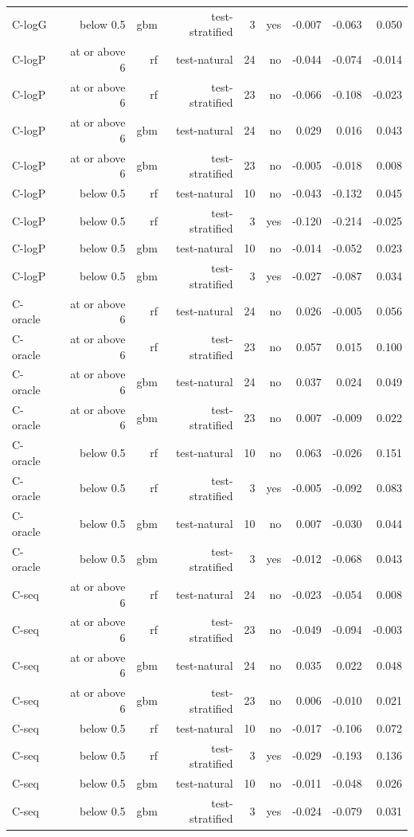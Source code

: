 \begin{table}[htbp]
\begin{tabular}{lrrrrrrrr}
C-logG & below 0.5 & gbm & test-stratified & 3 & yes & -0.007 & -0.063 & 0.050 \\
C-logP & at or above 6 & rf & test-natural & 24 & no & -0.044 & -0.074 & -0.014 \\
C-logP & at or above 6 & rf & test-stratified & 23 & no & -0.066 & -0.108 & -0.023 \\
C-logP & at or above 6 & gbm & test-natural & 24 & no & 0.029 & 0.016 & 0.043 \\
C-logP & at or above 6 & gbm & test-stratified & 23 & no & -0.005 & -0.018 & 0.008 \\
C-logP & below 0.5 & rf & test-natural & 10 & no & -0.043 & -0.132 & 0.045 \\
C-logP & below 0.5 & rf & test-stratified & 3 & yes & -0.120 & -0.214 & -0.025 \\
C-logP & below 0.5 & gbm & test-natural & 10 & no & -0.014 & -0.052 & 0.023 \\
C-logP & below 0.5 & gbm & test-stratified & 3 & yes & -0.027 & -0.087 & 0.034 \\
C-oracle & at or above 6 & rf & test-natural & 24 & no & 0.026 & -0.005 & 0.056 \\
C-oracle & at or above 6 & rf & test-stratified & 23 & no & 0.057 & 0.015 & 0.100 \\
C-oracle & at or above 6 & gbm & test-natural & 24 & no & 0.037 & 0.024 & 0.049 \\
C-oracle & at or above 6 & gbm & test-stratified & 23 & no & 0.007 & -0.009 & 0.022 \\
C-oracle & below 0.5 & rf & test-natural & 10 & no & 0.063 & -0.026 & 0.151 \\
C-oracle & below 0.5 & rf & test-stratified & 3 & yes & -0.005 & -0.092 & 0.083 \\
C-oracle & below 0.5 & gbm & test-natural & 10 & no & 0.007 & -0.030 & 0.044 \\
C-oracle & below 0.5 & gbm & test-stratified & 3 & yes & -0.012 & -0.068 & 0.043 \\
C-seq & at or above 6 & rf & test-natural & 24 & no & -0.023 & -0.054 & 0.008 \\
C-seq & at or above 6 & rf & test-stratified & 23 & no & -0.049 & -0.094 & -0.003 \\
C-seq & at or above 6 & gbm & test-natural & 24 & no & 0.035 & 0.022 & 0.048 \\
C-seq & at or above 6 & gbm & test-stratified & 23 & no & 0.006 & -0.010 & 0.021 \\
C-seq & below 0.5 & rf & test-natural & 10 & no & -0.017 & -0.106 & 0.072 \\
C-seq & below 0.5 & rf & test-stratified & 3 & yes & -0.029 & -0.193 & 0.136 \\
C-seq & below 0.5 & gbm & test-natural & 10 & no & -0.011 & -0.048 & 0.026 \\
C-seq & below 0.5 & gbm & test-stratified & 3 & yes & -0.024 & -0.079 & 0.031 \\
\bottomrule
\end{tabular}
\end{table}
